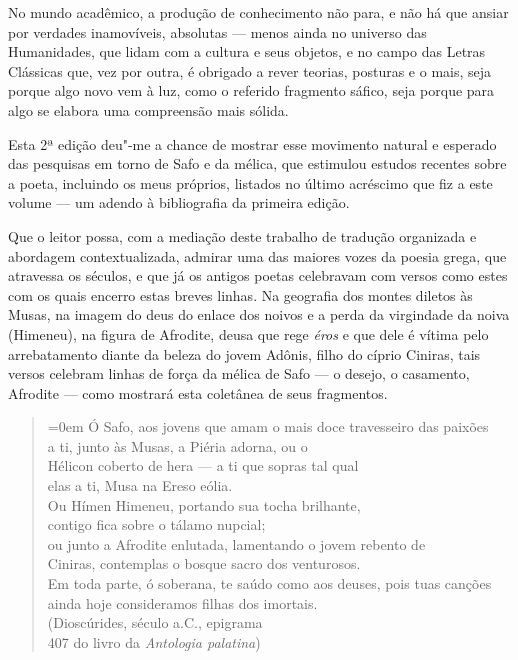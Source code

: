 No mundo acadêmico, a produção de conhecimento não para, e não há que
ansiar por verdades inamovíveis, absolutas --- menos ainda no universo
das Humanidades, que lidam com a cultura e seus objetos,
e no campo das Letras Clássicas que, vez por outra, é obrigado a rever
teorias, posturas e o mais, seja porque algo novo vem à luz, como o referido fragmento sáfico, seja porque para algo se elabora uma compreensão mais
sólida.

Esta 2ª edição deu"-me a chance de mostrar esse movimento natural e
esperado das pesquisas em torno de Safo e da mélica, que estimulou
estudos recentes sobre a poeta, incluindo os meus próprios, listados no
último acréscimo que fiz a este volume --- um adendo à bibliografia
da primeira edição.

Que o leitor possa, com a mediação deste trabalho de tradução organizada
e abordagem contextualizada, admirar uma das maiores vozes da poesia grega, que
atravessa os séculos, e que já os antigos poetas celebravam com versos
como estes com os quais encerro estas breves linhas.
Na geografia dos montes diletos às Musas, na imagem do deus do enlace dos noivos e a perda da virgindade da noiva (Himeneu), na figura de Afrodite, deusa que rege \textit{éros} e que dele é vítima pelo arrebatamento diante da beleza do jovem Adônis, filho do cíprio Ciniras, tais versos celebram linhas de força da mélica de Safo --- o desejo, o casamento, Afrodite --- como mostrará esta coletânea de seus fragmentos.

\begin{quote}\parindent=0em
Ó Safo, aos jovens que amam o mais doce travesseiro das paixões\\
a ti, junto às Musas, a Piéria adorna, ou o\\
Hélicon coberto de hera --- a ti que sopras tal qual\\
elas a ti, Musa na Ereso eólia.\\
Ou Hímen Himeneu, portando sua tocha brilhante,\\
contigo fica sobre o tálamo nupcial;\\
ou junto a Afrodite enlutada, lamentando o jovem rebento de\\
Ciniras, contemplas o bosque sacro dos venturosos.\\
Em toda parte, ó soberana, te saúdo como aos deuses, pois tuas \qb{}canções\\
ainda hoje consideramos filhas dos imortais.\\
\mbox{}\hfill{}(Dioscúrides, século  a.C., epigrama\\
\mbox{}\hfill{}407 do livro  da \emph{Antologia palatina})
\end{quote}


